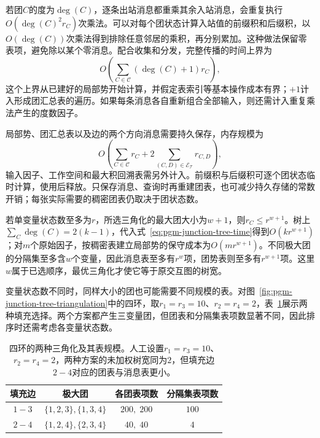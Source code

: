 若团$C$的度为$\deg(C)$，逐条出站消息都重乘其余入站消息，会重复执行$O(\deg(C)^2r_C)$次乘法。可以对每个团状态计算入站值的前缀积和后缀积，以$O(\deg(C))$次乘法得到排除任意邻居的乘积，再分别累加。这种做法保留零表项，避免除以某个零消息。配合收集和分发，完整传播的时间上界为
\begin{equation}
  O\!\left(\sum_{C\in\mathcal{C}}(\deg(C)+1)r_C\right),
  \label{eq:pgm-junction-tree-time}
\end{equation}
这个上界从已建好的局部势开始计算，并假定表索引等基本操作成本有界；$+1$计入形成团汇总表的遍历。如果每条消息各自重新组合全部输入，则还需计入重复乘法产生的度数因子。

局部势、团汇总表以及边的两个方向消息需要持久保存，内存规模为
\begin{equation}
  O\!\left(
    \sum_{C\in\mathcal{C}}r_C+
    2\sum_{(C,D)\in\mathcal{E}_{\mathcal{T}}}r_{C,D}
  \right),
  \label{eq:pgm-junction-tree-memory}
\end{equation}
输入因子、工作空间和最大积回溯表需另外计入。前缀积与后缀积可逐个团状态临时计算，使用后释放。只保存消息、查询时再重建团表，也可减少持久存储的常数开销；每张实际需要的稠密团表仍取决于团状态数。

若单变量状态数至多为$r$，所选三角化的最大团大小为$w+1$，则$r_C\le r^{w+1}$。树上$\sum_C\deg(C)=2(k-1)$，代入式~\eqref{eq:pgm-junction-tree-time}得到$O(kr^{w+1})$；对$m$个原始因子，按稠密表建立局部势的保守成本为$O(mr^{w+1})$。不同极大团的分隔集至多含$w$个变量，因此消息表至多有$r^w$项，团势表则至多有$r^{w+1}$项。这里$w$属于已选顺序，最优三角化才使它等于原交互图的树宽。

变量状态数不同时，同样大小的团也可能需要不同规模的表。对图~\ref{fig:pgm-junction-tree-triangulation}中的四环，取$r_1=r_3=10$、$r_2=r_4=2$，表~\ref{tab:pgm-junction-tree-triangulation-cost}展示两种填充选择。两个方案都产生三变量团，但团表和分隔集表项数显著不同，因此排序时还需考虑各变量状态数。

\begin{table}[htbp]
  \centering
  \begin{tabular}{cccc}
    \toprule
    填充边 & 极大团 & 各团表项数 & 分隔集表项数\\
    \midrule
    $1-3$ & $\{1,2,3\},\{1,3,4\}$ & $200,\;200$ & $100$\\
    $2-4$ & $\{1,2,4\},\{2,3,4\}$ & $40,\;40$ & $4$\\
    \bottomrule
  \end{tabular}
  \caption{四环的两种三角化及其表规模。人工设置$r_1=r_3=10$、$r_2=r_4=2$，两种方案的未加权树宽同为$2$，但填充边$2-4$对应的团表与消息表更小。}
  \label{tab:pgm-junction-tree-triangulation-cost}
\end{table}


